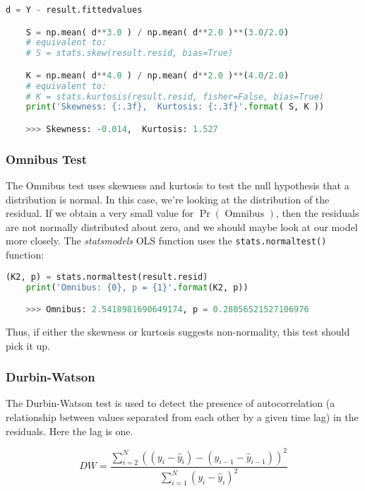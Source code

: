 \begin{lstlisting}[language=Python]
    d = Y - result.fittedvalues

    S = np.mean( d**3.0 ) / np.mean( d**2.0 )**(3.0/2.0)
    # equivalent to:
    # S = stats.skew(result.resid, bias=True)

    K = np.mean( d**4.0 ) / np.mean( d**2.0 )**(4.0/2.0)
    # equivalent to:
    # K = stats.kurtosis(result.resid, fisher=False, bias=True)
    print('Skewness: {:.3f},  Kurtosis: {:.3f}'.format( S, K ))

    >>> Skewness: -0.014,  Kurtosis: 1.527
\end{lstlisting}

\subsubsection{Omnibus Test}

The Omnibus test uses skewness and kurtosis to test the null hypothesis that a distribution is normal. In this case, we’re looking at the distribution of the residual. If we obtain a very small value for $\Pr( \mbox{ Omnibus } )$, then the residuals are not normally distributed about zero, and we should maybe look at our model more closely. The \emph{statsmodels} OLS function uses the \lstinline{stats.normaltest()} function:

\begin{lstlisting}[language=Python]
    (K2, p) = stats.normaltest(result.resid)
    print('Omnibus: {0}, p = {1}'.format(K2, p))

    >>> Omnibus: 2.5418981690649174, p = 0.28056521527106976
\end{lstlisting}

Thus, if either the skewness or kurtosis suggests non-normality, this test should pick it up.

\subsubsection{Durbin-Watson}

The Durbin-Watson test is used to detect the presence of autocorrelation (a relationship between values separated from each other by a given time lag) in the residuals. Here the lag is one.

\begin{equation}
 DW = \dfrac{ \displaystyle \sum_{i=2}^{N} ( ( y_{i} - \hat{y}_i ) - ( y_{i-1} - \hat{y}_{i-1} ) )^{2} }{ \displaystyle \sum_{i=1}^{N} ( y_{i} - \hat{y}_{i} )^{2}}
 \end{equation}

